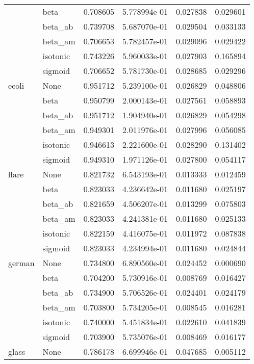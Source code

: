 \begin{tabular}{llrrrr}
        & beta &  0.708605 &  5.778994e-01 &  0.027838 &  0.029601 \\
        & beta\_ab &  0.739708 &  5.687070e-01 &  0.029504 &  0.033133 \\
        & beta\_am &  0.706653 &  5.782457e-01 &  0.029096 &  0.029422 \\
        & isotonic &  0.743226 &  5.960033e-01 &  0.027903 &  0.165894 \\
        & sigmoid &  0.706652 &  5.781730e-01 &  0.028685 &  0.029296 \\
ecoli & None &  0.951712 &  5.239100e-01 &  0.026829 &  0.048806 \\
        & beta &  0.950799 &  2.000143e-01 &  0.027561 &  0.058893 \\
        & beta\_ab &  0.951712 &  1.904940e-01 &  0.026829 &  0.054298 \\
        & beta\_am &  0.949301 &  2.011976e-01 &  0.027996 &  0.056085 \\
        & isotonic &  0.946613 &  2.221600e-01 &  0.028290 &  0.131402 \\
        & sigmoid &  0.949310 &  1.971126e-01 &  0.027800 &  0.054117 \\
flare & None &  0.821732 &  6.543193e-01 &  0.013333 &  0.012459 \\
        & beta &  0.823033 &  4.236642e-01 &  0.011680 &  0.025197 \\
        & beta\_ab &  0.821659 &  4.506207e-01 &  0.013299 &  0.075803 \\
        & beta\_am &  0.823033 &  4.241381e-01 &  0.011680 &  0.025133 \\
        & isotonic &  0.822159 &  4.416075e-01 &  0.011972 &  0.087838 \\
        & sigmoid &  0.823033 &  4.234994e-01 &  0.011680 &  0.024844 \\
german & None &  0.734800 &  6.890560e-01 &  0.024452 &  0.000690 \\
        & beta &  0.704200 &  5.730916e-01 &  0.008769 &  0.016427 \\
        & beta\_ab &  0.734900 &  5.706526e-01 &  0.024401 &  0.024179 \\
        & beta\_am &  0.703800 &  5.734205e-01 &  0.008545 &  0.016281 \\
        & isotonic &  0.740000 &  5.451834e-01 &  0.022610 &  0.041839 \\
        & sigmoid &  0.703900 &  5.735076e-01 &  0.008469 &  0.016177 \\
glass & None &  0.786178 &  6.699946e-01 &  0.047685 &  0.005112 \\

\end{tabular}

